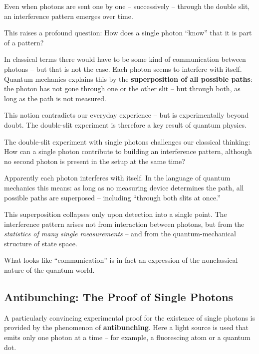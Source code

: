 \begin{tcolorbox}[didaktikbox, title=Conclusion: An Apparently Paradoxical Behavior]
	\label{box:Fazit ein scheinbarer}
	\small
	Even when photons are sent one by one – successively – through the double slit, an interference pattern emerges over time.
	
	This raises a profound question: How does a single photon “know” that it is part of a pattern?
	
	In classical terms there would have to be some kind of communication between photons – but that is not the case. Each photon seems to interfere with itself. Quantum mechanics explains this by the \textbf{superposition of all possible paths}: the photon has not gone through one or the other slit – but through both, as long as the path is not measured.
	
	This notion contradicts our everyday experience – but is experimentally beyond doubt. The double-slit experiment is therefore a key result of quantum physics.
	
	The double-slit experiment with single photons challenges our classical thinking:  
	How can a single photon contribute to building an interference pattern, although no second photon is present in the setup at the same time?
	
	Apparently each photon interferes with itself. In the language of quantum mechanics this means: as long as no measuring device determines the path, all possible paths are superposed – including “through both slits at once.”
	
	This superposition collapses only upon detection into a single point. The interference pattern arises not from interaction between photons, but from the \emph{statistics of many single measurements} – and from the quantum-mechanical structure of state space.
	
	What looks like “communication” is in fact an expression of the nonclassical nature of the quantum world.
\end{tcolorbox}

\subsection{Antibunching: The Proof of Single Photons}

A particularly convincing experimental proof for the existence of single photons is provided by the phenomenon of \textbf{antibunching}. Here a light source is used that emits only one photon at a time – for example, a fluorescing atom or a quantum dot.

